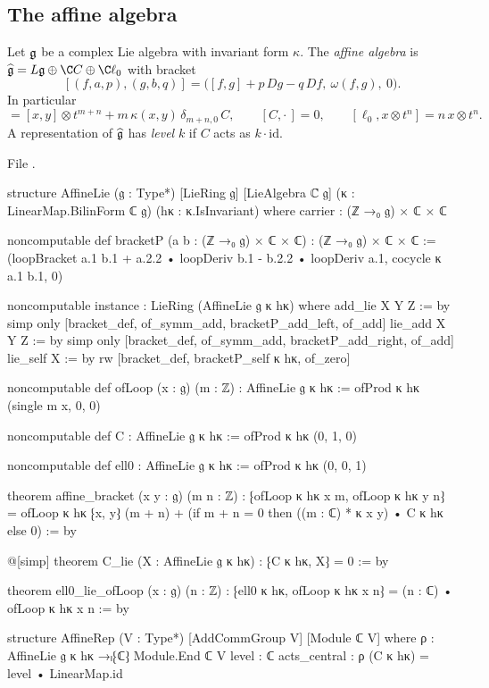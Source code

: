 \subsection{The affine algebra}

\begin{definition}\label{l02:def:affine}
Let $\mathfrak{g}$ be a complex Lie algebra with invariant form $\kappa$. The \emph{affine algebra} is
$\ltwoghat = L\ltwog\oplus\C C\oplus\C\ell_0$ with bracket
\begin{equation}\label{l02:eq:bracketP}
 [(f,a,p),(g,b,q)] = \bigl([f,g] + p\,Dg - q\,Df,\ \omega(f,g),\ 0\bigr).
\end{equation}
In particular
\begin{equation*}
 [x\otimes t^m, y\otimes t^n] = [x,y]\otimes t^{m+n} + m\,\kappa(x,y)\,\delta_{m+n,0}\,C,\qquad
 [C,\cdot\,] = 0,\qquad [\ell_0,x\otimes t^n] = n\,x\otimes t^n.
\end{equation*}
A representation of $\widehat{\mathfrak{g}}$ has \emph{level} $k$ if $C$ acts as $k\cdot\mathrm{id}$.
\end{definition}

File .
\begin{leancode}
structure AffineLie (𝔤 : Type*) [LieRing 𝔤] [LieAlgebra ℂ 𝔤]
    (κ : LinearMap.BilinForm ℂ 𝔤) (hκ : κ.IsInvariant) where
  carrier : (ℤ →₀ 𝔤) × ℂ × ℂ

noncomputable def bracketP (a b : (ℤ →₀ 𝔤) × ℂ × ℂ) : (ℤ →₀ 𝔤) × ℂ × ℂ :=
  (loopBracket a.1 b.1 + a.2.2 • loopDeriv b.1 - b.2.2 • loopDeriv a.1, cocycle κ a.1 b.1, 0)

noncomputable instance : LieRing (AffineLie 𝔤 κ hκ) where
  add_lie X Y Z := by
    simp only [bracket_def, of_symm_add, bracketP_add_left, of_add]
  lie_add X Y Z := by
    simp only [bracket_def, of_symm_add, bracketP_add_right, of_add]
  lie_self X := by
    rw [bracket_def, bracketP_self κ hκ, of_zero]

noncomputable def ofLoop (x : 𝔤) (m : ℤ) : AffineLie 𝔤 κ hκ := ofProd κ hκ (single m x, 0, 0)

noncomputable def C : AffineLie 𝔤 κ hκ := ofProd κ hκ (0, 1, 0)

noncomputable def ell0 : AffineLie 𝔤 κ hκ := ofProd κ hκ (0, 0, 1)

theorem affine_bracket (x y : 𝔤) (m n : ℤ) :
    ⁅ofLoop κ hκ x m, ofLoop κ hκ y n⁆
      = ofLoop κ hκ ⁅x, y⁆ (m + n)
        + (if m + n = 0 then ((m : ℂ) * κ x y) • C κ hκ else 0) := by

@[simp] theorem C_lie (X : AffineLie 𝔤 κ hκ) : ⁅C κ hκ, X⁆ = 0 := by

theorem ell0_lie_ofLoop (x : 𝔤) (n : ℤ) :
    ⁅ell0 κ hκ, ofLoop κ hκ x n⁆ = (n : ℂ) • ofLoop κ hκ x n := by

structure AffineRep (V : Type*) [AddCommGroup V] [Module ℂ V] where
  ρ : AffineLie 𝔤 κ hκ →ₗ⁅ℂ⁆ Module.End ℂ V
  level : ℂ
  acts_central : ρ (C κ hκ) = level • LinearMap.id
\end{leancode}

